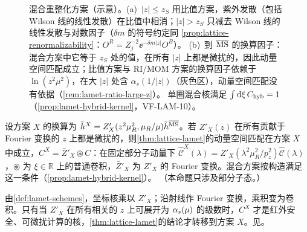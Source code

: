 \begin{figure}[htbp]
\caption{混合重整化方案（示意）。(a)~$|z|\le z_S$ 用比值方案，紫外发散（包括 Wilson 线的线性发散）在比值中相消；$|z|>z_S$ 只减去 Wilson 线的线性发散与对数因子（$\delta m$ 的符号约定同 \cref{prop:lattice-renormalizability}：$O^R=Z_j^{-2}\ee^{-\delta m|z|}O^B$）。
(b)~到 $\overline{\mathrm{MS}}$ 的换算因子：混合方案中它等于 $z_S$ 处的值，在所有 $|z|$ 上都是微扰的，因此动量空间匹配成立；比值方案与 RI/MOM 方案的换算因子依赖于 $\ln(z^2\mu^2)$，在大 $|z|$ 处含 $\alpha_s(1/|z|)$（灰色区），动量空间匹配没有依据（\cref{rem:lamet-ratio-large-z}）。
单圈混合核满足 $\int\mathrm{d}\xi\,C_{\rm hyb}=1$（\cref{prop:lamet-hybrid-kernel}，VF-LAM-10）。}
\label{fig:lamet-hybrid}
\end{figure}
\begin{proposition}\label{prop:lamet-scheme-validity}
设方案 $X$ 的换算为 $\tilde h^X=Z'_X(z^2\mu_R^2,\mu_R/\mu)\tilde h^{\overline{\mathrm{MS}}}$。若 $Z'_X(z)$ 在所有贡献于 Fourier 变换的 $z$ 上都是微扰的，则\cref{thm:lattice-lamet}的动量空间匹配在方案 $X$ 中成立，$C^X=\bar Z'_X\circledast C$：在固定部分子动量下 $\hat{\mathcal C}^X(\lambda)=Z'_X(\lambda^2\mu_R^2/p_z^2)\hat{\mathcal C}(\lambda)$，$\circledast$ 为 $\xi\in\mathbb R$ 上的普通卷积，$\bar Z'_X$ 为 $Z'_X$ 的 Fourier 变换。混合方案按构造满足这一条件（\cref{prop:lamet-hybrid-kernel}）。
（本命题只涉及部分子态。）
\end{proposition}

\begin{proofsketch}
由\cref{def:lamet-schemes}，坐标核乘以 $Z'_X$；沿射线作 Fourier 变换，乘积变为卷积。只有当 $Z'_X$ 在所有相关的 $z$ 上可展开为 $\alpha_s(\mu)$ 的级数时，$C^X$ 才是红外安全、可微扰计算的核，\cref{thm:lattice-lamet}的结论才转移到方案 $X$。见\cite{JiEtAl2021,Ji:2020brr}。
\end{proofsketch}

